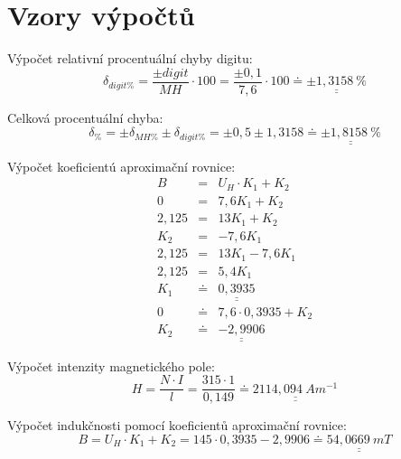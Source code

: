 \section{Vzory výpočtů}
  
  \indent\indent Výpočet relativní procentuální chyby digitu:
  \begin{equation}
    \delta _{digit\%} = \dfrac{\pm digit}{MH} \cdot 100 = \dfrac{\pm 0,1}{7,6} \cdot 100 \doteq \underline{\underline{\pm 1,3158~\%}}
    \nonumber
  \end{equation}
  
  Celková procentuální chyba:
  \begin{equation}
    \delta_{\%} = \pm\delta_{MH\%} \pm \delta_{digit\%} = \pm 0,5 \pm 1,3158 \doteq \underline{\underline{\pm 1,8158~\%}}
    \nonumber
  \end{equation} 
  
  Výpočet koeficientú aproximační rovnice:
  \begin{eqnarray}
      B &=& U_H \cdot K_1 + K_2    
      \nonumber\\
      0 &=& 7,6K_1 + K_2
      \nonumber\\
      2,125 &=& 13K_1 + K_2
      \nonumber\\
      K_2 &=& -7,6K_1
      \nonumber\\
      2,125 &=& 13K_1 -7,6K_1
      \nonumber\\
      2,125 &=& 5,4K_1
      \nonumber\\
      K_1 &\doteq& \underline{\underline{0,3935}}
      \nonumber\\
      0 &\doteq& 7,6 \cdot 0,3935 + K_2
      \nonumber\\
      K_2 &\doteq& \underline{\underline{-2,9906}}
      \nonumber
    \end{eqnarray}
    
    Výpočet intenzity magnetického pole:
    \begin{equation}
    	H = \dfrac{N \cdot I}{l} = \dfrac{315 \cdot 1}{0,149} \doteq \underline{\underline{2114,094~Am^{-1}}}
    \nonumber
  \end{equation} 
  
  Výpočet indukčnosti pomocí koeficientů aproximační rovnice:
    \begin{equation}
    	B = U_H \cdot K_1 + K_2 = 145 \cdot 0,3935 - 2,9906  \doteq \underline{\underline{54,0669~mT}}
    \nonumber
  \end{equation} 
